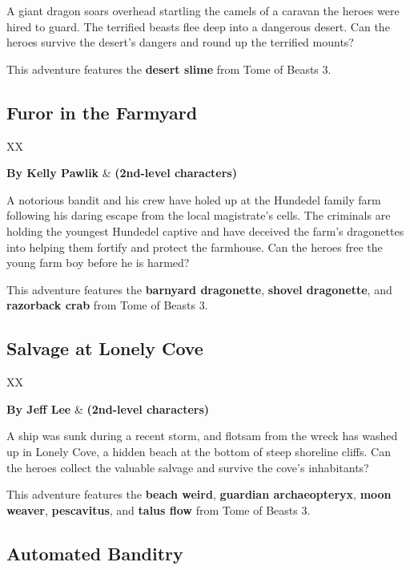 \documentclass[10pt,a4paper,twoside,bg=print,twocolumn,openany,nodeprecatedcode]{dndbook}
\begin{document}
A giant dragon soars overhead startling the camels of a caravan the heroes were hired to guard. The terrified beasts flee deep into a dangerous desert. Can the heroes survive the desert's dangers and round up the terrified mounts?

This adventure features the \textbf{desert slime} from Tome of Beasts 3.

\subsection{Furor in the Farmyard}

\begin{DndTable}{XX}

\textbf{By Kelly Pawlik} & \textbf{(2nd-level characters)}\\
\end{DndTable}

A notorious bandit and his crew have holed up at the Hundedel family farm following his daring escape from the local magistrate's cells. The criminals are holding the youngest Hundedel captive and have deceived the farm's dragonettes into helping them fortify and protect the farmhouse. Can the heroes free the young farm boy before he is harmed?

This adventure features the \textbf{barnyard dragonette}, \textbf{shovel dragonette}, and \textbf{razorback crab} from Tome of Beasts 3.

\subsection{Salvage at Lonely Cove}

\begin{DndTable}{XX}

\textbf{By Jeff Lee} & \textbf{(2nd-level characters)}\\
\end{DndTable}

A ship was sunk during a recent storm, and flotsam from the wreck has washed up in Lonely Cove, a hidden beach at the bottom of steep shoreline cliffs. Can the heroes collect the valuable salvage and survive the cove's inhabitants?

This adventure features the \textbf{beach weird}, \textbf{guardian archaeopteryx}, \textbf{moon weaver}, \textbf{pescavitus}, and \textbf{talus flow} from Tome of Beasts 3.

\subsection{Automated Banditry}
\end{document}
